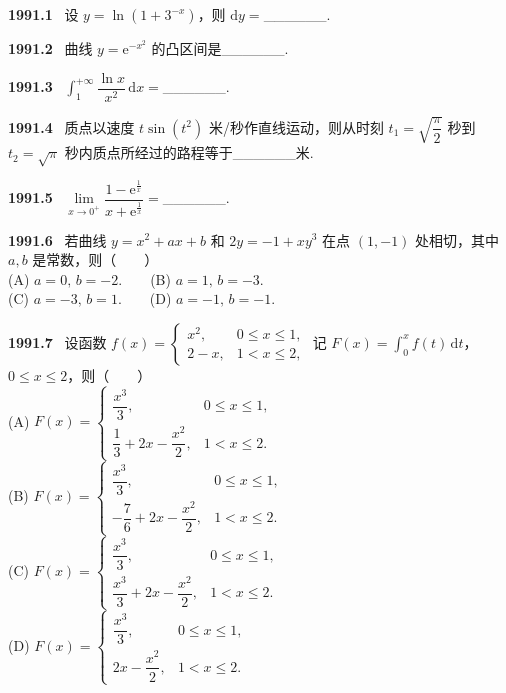 \documentclass[UTF8,12pt]{ctexart}
\newcommand{\qn}[1]{\textbf{\large #1}\ }
\begin{document}
\qn{1991.1}
设 $y=\ln(1+3^{-x})$，则 $\mathrm{d}y=$______.

\vfill
\newpage
\qn{1991.2}
曲线 $y=\mathrm{e}^{-x^2}$ 的凸区间是______.

\vfill
\newpage
\qn{1991.3}
$\int_1^{+\infty}\dfrac{\ln x}{x^2}\,\mathrm{d}x=$______.

\vfill
\newpage
\qn{1991.4}
质点以速度 $t\sin(t^2)$ 米/秒作直线运动，则从时刻 $t_1=\sqrt{\dfrac{\pi}{2}}$ 秒到 $t_2=\sqrt{\pi}$ 秒内质点所经过的路程等于______米.

\vfill
\newpage
\qn{1991.5}
$\lim\limits_{x\to0^+}\dfrac{1-\mathrm{e}^{\frac{1}{x}}}{x+\mathrm{e}^{\frac{1}{x}}}=$______.

\vfill
\newpage
\qn{1991.6}
若曲线 $y=x^2+ax+b$ 和 $2y=-1+xy^3$ 在点 $(1,-1)$ 处相切，其中 $a,b$ 是常数，则（　　）
\\
\noindent (A) $a=0,\,b=-2$.　　(B) $a=1,\,b=-3$.
\\
\noindent (C) $a=-3,\,b=1$.　　(D) $a=-1,\,b=-1$.

\vfill
\newpage
\qn{1991.7}
设函数 $f(x)=\begin{cases} x^2, & 0\leqslant x\leqslant 1, \\ 2-x, & 1<x\leqslant 2, \end{cases}$ 记 $F(x)=\int_0^x f(t)\,\mathrm{d}t$，$0\leqslant x\leqslant 2$，则（　　）
\\
\noindent (A) $F(x)=\begin{cases} \dfrac{x^3}{3}, & 0\leqslant x\leqslant 1, \\[6pt] \dfrac{1}{3}+2x-\dfrac{x^2}{2}, & 1<x\leqslant 2. \end{cases}$
\\
\noindent (B) $F(x)=\begin{cases} \dfrac{x^3}{3}, & 0\leqslant x\leqslant 1, \\[6pt] -\dfrac{7}{6}+2x-\dfrac{x^2}{2}, & 1<x\leqslant 2. \end{cases}$
\\
\noindent (C) $F(x)=\begin{cases} \dfrac{x^3}{3}, & 0\leqslant x\leqslant 1, \\[6pt] \dfrac{x^3}{3}+2x-\dfrac{x^2}{2}, & 1<x\leqslant 2. \end{cases}$
\\
\noindent (D) $F(x)=\begin{cases} \dfrac{x^3}{3}, & 0\leqslant x\leqslant 1, \\[6pt] 2x-\dfrac{x^2}{2}, & 1<x\leqslant 2. \end{cases}$
\end{document}
